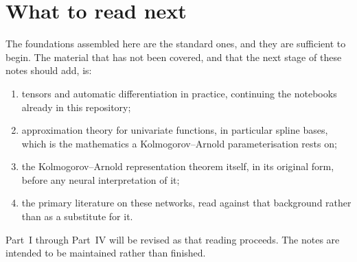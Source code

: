 \section{What to read next}

The foundations assembled here are the standard ones, and they are sufficient to
begin. The material that has not been covered, and that the next stage of these
notes should add, is:

\begin{enumerate}
	\item tensors and automatic differentiation in practice, continuing the
	notebooks already in this repository;
	\item approximation theory for univariate functions, in particular spline
	bases, which is the mathematics a Kolmogorov--Arnold parameterisation
	rests on;
	\item the Kolmogorov--Arnold representation theorem itself, in its original
	form, before any neural interpretation of it;
	\item the primary literature on these networks, read against that
	background rather than as a substitute for it.
\end{enumerate}


Part~I through Part~IV will be revised as that reading proceeds. The notes are
intended to be maintained rather than finished.
